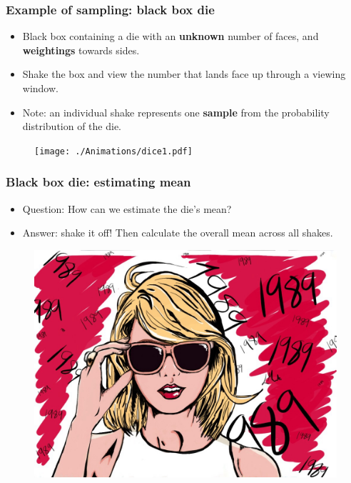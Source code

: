 \documentclass[handout]{beamer}
\begin{document}
\frame{\tableofcontents[currentsection]}

\begin{frame}
	\frametitle{Example of sampling: black box die}
	
	\begin{itemize}
		\item<2-> Black box containing a die with an \textbf{unknown} number of faces, and \textbf{weightings} towards sides. 
		\item<3-> Shake the box and view the number that lands face up through a viewing window.
		\item<4-> Note: an individual shake represents one \textbf{sample} from the probability distribution of the die.
	\end{itemize}
	
	\begin{figure}[ht]
		\centerline{\texttt{[image: ./Animations/dice1.pdf]}}
	\end{figure}
	
\end{frame}

\begin{frame}
	\frametitle{Black box die: estimating mean}
	
	\begin{itemize}
		\item<2-> Question: How can we estimate the die's mean?
		\item<3-> Answer: shake it off! Then calculate the overall mean across all shakes.
	\end{itemize}
	
	\begin{figure}[ht]
		\centerline{\includegraphics[width=1.0\textwidth]{./Animations/taylorSwift.jpg}}
	\end{figure}
	
\end{frame}
\end{document}
